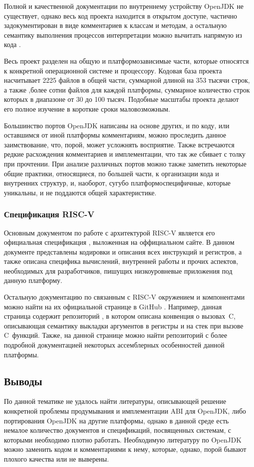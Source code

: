 Полной и качественной документации по внутреннему устройству OpenJDK не существует, однако весь код проекта находится в открытом доступе, частично задокументирован в виде комментариев к классам и методам, а остальную семантику выполнения процессов интерпретации можно вычитать напрямую из кода \cite{hotspot}.

    Весь проект разделен на общую и платформозависимые части, которые относятся к конкретной операционной системе и процессору. Кодовая база проекта насчитывает 2225 файлов в общей части, суммарной длиной на 353 тысячи строк, а также ,более сотни файлов для каждой платформы, суммарное количество строк которых в диапазоне от 30 до 100 тысяч. Подобные масштабы проекта делают его полное изучение в короткие сроки маловозможным.

Большинство портов OpenJDK написаны на основе других, и по коду, или оставшимся от иной платформы комментариям, можно проследить данное заимствование, что, порой, может усложнять восприятие. Также встречаются редкие расхождения комментариев и имплементации, что так же сбивает с толку при прочтении. При анализе различных портов можно также заметить некоторые общие практики, относящиеся, по большей части, к организации кода и внутренних структур, и, наоборот, сугубо платформоспецифичные, которые уникальны, и не поддаются общей характеристике.


\subsubsection*{Спецификация RISC-V}

Основным документом по работе с архитектурой RISC-V является его официальная спецификация \cite{riscv:spec}, выложенная на оффициальном сайте. В данном документе представлены кодировки и описания всех инструкций и регистров, а также описана специфика вычислений, внутренней работы и прочих аспектов, необходимых для разработчиков, пишущих низкоуровневые приложения под данную платформу. 

Остальную документацию по связанным с RISC-V окружением и компонентами можно найти на их официальной странице в GitHub \cite{riscv:github}. Например, данная страница содержит репозиторий \cite{riscv:convention}, в котором описана конвенция о вызовах~C, описывающая семантику выкладки аргументов в регистры и на стек при вызове C~функций. Также, на данной странице можно найти репозиторий \cite{riscv:asm} с более подробной документацией некоторых ассемблерных особенностей данной платформы.


\subsection*{Выводы}

По данной тематике не удалось найти литературы, описывающей решение конкретной проблемы продумывания и имплементации ABI для OpenJDK, либо портирования OpenJDK на другие платформы, однако в данной среде есть немалое количество документов и спецификаций, посвященных системам, с которыми необходимо плотно работать. Необходимую литературу по OpenJDK можно заменить кодом и комментариями к нему, которые, однако, порой бывают плохого качества или не выверены.
